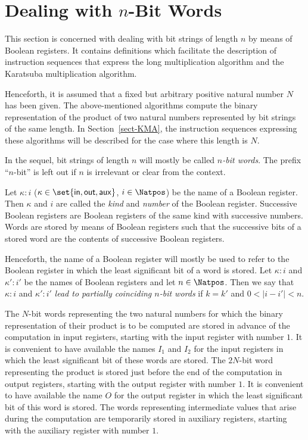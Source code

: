 \documentclass{llncs}
\begin{document}
\section{Dealing with $n$-Bit Words}
\label{sect-words}

This section is concerned with dealing with bit strings of length $n$ 
by means of Boolean registers.
It contains definitions which facilitate the description of instruction 
sequences that express the long multiplication algorithm and the 
Karatsuba multiplication algorithm.

Henceforth, it is assumed that a fixed but arbitrary positive natural 
number $N$ has been given.
The above-mentioned algorithms compute the binary representation of the 
product of two natural numbers represented by bit strings of the same 
length.
In Section~\ref{sect-KMA}, the instruction sequences expressing these 
algorithms will be described for the case where this length is $N$.

In the sequel, bit strings of length $n$ will mostly be called 
\emph{$n$-bit words}.
The prefix ``$n$-bit'' is left out if $n$ is irrelevant or clear from
the context.

Let $\kappa{:}i$ 
($\kappa \in \set{\mathsf{in},\mathsf{out},\mathsf{aux}}$, 
 $i \in \Natpos$) be the name of a Boolean register.
Then $\kappa$ and $i$ are called the \emph{kind} and \emph{number} of 
the Boolean register.
Successive Boolean registers are Boolean registers of the same kind with
successive numbers.
Words are stored by means of Boolean registers such that the successive 
bits of a stored word are the contents of successive Boolean registers.

Henceforth, the name of a Boolean register will mostly be used to refer 
to the Boolean register in which the least significant bit of a word is 
stored.
Let $\kappa{:}i$ and $\kappa'{:}i'$ be the names of Boolean registers 
and let $n \in \Natpos$.
Then we say that $\kappa{:}i$ and $\kappa'{:}i'$ \emph{lead to partially 
coinciding $n$-bit words} if $k = k'$ and $0 < |i - i'| < n$.

The $N$-bit words representing the two natural numbers for which the 
binary representation of their product is to be computed are stored in 
advance of the computation in input registers, starting with the input 
register with number $1$.
It is convenient to have available the names $I_1$ and $I_2$ for the 
input registers in which the least significant bit of these words are 
stored.
The $2N$-bit word representing the product is stored just before the end 
of the computation in output registers, starting with the output 
register with number $1$. 
It is convenient to have available the name $O$ for the output register 
in which the least significant bit of this word is stored.
The words representing intermediate values that arise during the 
computation are temporarily stored in auxiliary registers, starting with 
the auxiliary register with number $1$.
\end{document}
